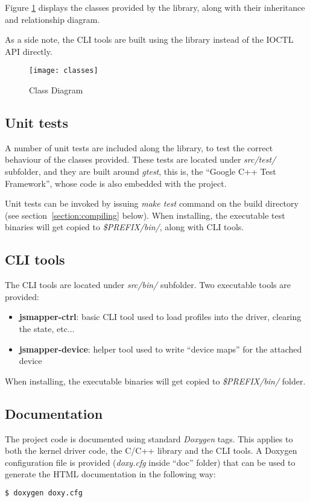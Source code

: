 Figure \ref{fig:dev_classes} displays the classes provided by the library, along with their inheritance and relationship diagram.

As a side note, the CLI tools are built using the library instead of the IOCTL API directly.

\begin{figure}[tp]
\centering
\texttt{[image: classes]}
\caption{Class Diagram}
\label{fig:dev_classes}
\end{figure}


\subsection{Unit tests}
A number of unit tests are included along the library, to test the correct behaviour of the classes provided. These tests are located under \emph{src/test/} subfolder, and they are built around \emph{gtest}, this is, the ``Google C++ Test Framework'', whose code is also embedded with the project.

Unit tests can be invoked by issuing \emph{make test} command on the build directory (see section~\ref{section:compiling} below). When installing, the executable test binaries will get copied to \emph{\$PREFIX/bin/}, along with CLI tools.


\subsection{CLI tools}
The CLI tools are located under \emph{src/bin/} subfolder. Two executable tools are provided:
\begin{itemize}
  \item \textbf{jsmapper-ctrl}: basic CLI tool used to load profiles into the driver, clearing the state, etc...
  \item \textbf{jsmapper-device}: helper tool used to write ``device maps'' for the attached device
\end{itemize}

When installing, the executable binaries will get copied to \emph{\$PREFIX/bin/} folder.


\subsection{Documentation}
The project code is documented using standard \emph{Doxygen} tags. This applies to both the kernel driver code, the C/C++ library and the CLI tools. A Doxygen configuration file is provided (\emph{doxy.cfg} inside ``doc'' folder) that can be used to generate the HTML documentation in the following way:
\begin{lstlisting}[language=bash,caption={Generating HTML documentation},label={lst:jsmapper_doxygen}]
$ doxygen doxy.cfg
\end{lstlisting}

